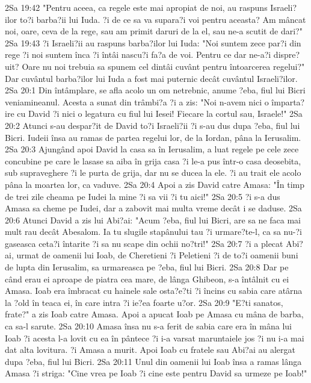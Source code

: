 2Sa 19:42  "Pentru aceea, ca regele este mai apropiat de noi, au raspuns Israeli?ilor to?i barba?ii lui Iuda. ?i de ce sa va supara?i voi pentru aceasta? Am mâncat noi, oare, ceva de la rege, sau am primit daruri de la el, sau ne-a scutit de dari?"
2Sa 19:43  ?i Israeli?ii au raspuns barba?ilor lui Iuda: "Noi suntem zece par?i din rege ?i noi suntem înca ?i întâi nascu?i fa?a de voi. Pentru ce dar ne-a?i dispre?uit? Oare nu noi trebuia sa spunem cel dintâi cuvânt pentru întoarcerea regelui?" Dar cuvântul barba?ilor lui Iuda a fost mai puternic decât cuvântul Israeli?ilor.
2Sa 20:1  Din întâmplare, se afla acolo un om netrebnic, anume ?eba, fiul lui Bicri veniamineanul. Acesta a sunat din trâmbi?a ?i a zis: "Noi n-avem nici o împarta?ire cu David ?i nici o legatura cu fiul lui Iesei! Fiecare la cortul sau, Israele!"
2Sa 20:2  Atunci s-au despar?it de David to?i Israeli?ii ?i s-au dus dupa ?eba, fiul lui Bicri. Iudeii însa au ramas de partea regelui lor, de la Iordan, pâna la Ierusalim.
2Sa 20:3  Ajungând apoi David la casa sa în Ierusalim, a luat regele pe cele zece concubine pe care le lasase sa aiba în grija casa ?i le-a pus într-o casa deosebita, sub supraveghere ?i le purta de grija, dar nu se ducea la ele. ?i au trait ele acolo pâna la moartea lor, ca vaduve.
2Sa 20:4  Apoi a zis David catre Amasa: "În timp de trei zile cheama pe Iudei la mine ?i sa vii ?i tu aici!"
2Sa 20:5  ?i s-a dus Amasa sa cheme pe Iudei, dar a zabovit mai multa vreme decât i se daduse.
2Sa 20:6  Atunci David a zis lui Abi?ai: "Acum ?eba, fiul lui Bicri, are sa ne faca mai mult rau decât Abesalom. Ia tu slugile stapânului tau ?i urmare?te-l, ca sa nu-?i gaseasca ceta?i întarite ?i sa nu scape din ochii no?tri!"
2Sa 20:7  ?i a plecat Abi?ai, urmat de oamenii lui Ioab, de Cheretieni ?i Peletieni ?i de to?i oamenii buni de lupta din Ierusalim, sa urmareasca pe ?eba, fiul lui Bicri.
2Sa 20:8  Dar pe când erau ei aproape de piatra cea mare, de lânga Ghibeon, s-a întâlnit cu ei Amasa. Ioab era îmbracat cu hainele sale osta?e?ti ?i încins cu sabia care atârna la ?old în teaca ei, în care intra ?i ie?ea foarte u?or.
2Sa 20:9  "E?ti sanatos, frate?" a zis Ioab catre Amasa. Apoi a apucat Ioab pe Amasa cu mâna de barba, ca sa-l sarute.
2Sa 20:10  Amasa însa nu s-a ferit de sabia care era în mâna lui Ioab ?i acesta l-a lovit cu ea în pântece ?i i-a varsat maruntaiele jos ?i nu i-a mai dat alta lovitura. ?i Amasa a murit. Apoi Ioab cu fratele sau Abi?ai au alergat dupa ?eba, fiul lui Bicri.
2Sa 20:11  Unul din oamenii lui Ioab însa a ramas lânga Amasa ?i striga: "Cine vrea pe Ioab ?i cine este pentru David sa urmeze pe Ioab!"
